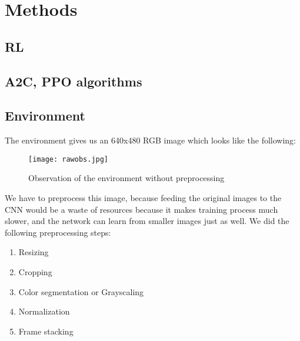 \documentclass{article}
\begin{document}
\section{\large{Methods}}

\subsection{\normalsize{RL}}

\subsection{\normalsize{A2C, PPO algorithms}}

\subsection{\normalsize{Environment}}

The environment gives us an 640x480 RGB image which looks like the following:
\begin{figure}[h!]
	\centering
	\texttt{[image: rawobs.jpg]}
	\caption{Observation of the environment without preprocessing}
\end{figure}
We have to preprocess this image, because feeding the original images to the CNN would be a waste of resources because it makes training process much slower, and the network can learn from smaller images just as well. We did the following preprocessing steps:
\begin{enumerate}
	\item Resizing
	\item Cropping
	\item Color segmentation or Grayscaling
	\item Normalization
	\item Frame stacking
\end{enumerate}
\end{document}
